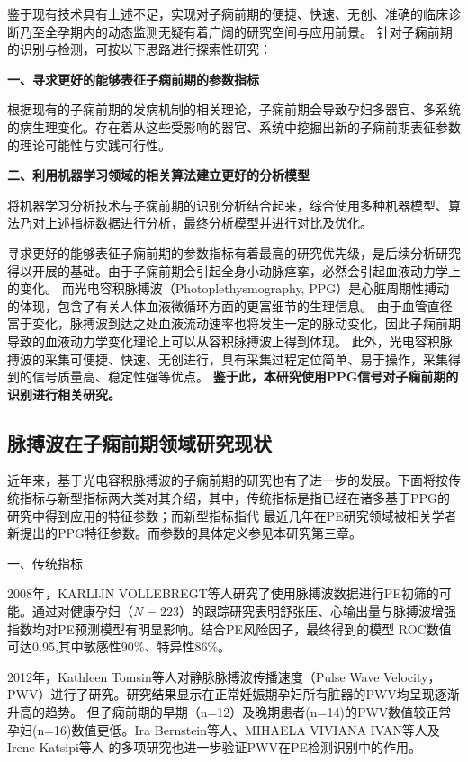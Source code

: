 鉴于现有技术具有上述不足，实现对子痫前期的便捷、快速、无创、准确的临床诊断乃至全孕期内的动态监测无疑有着广阔的研究空间与应用前景。
针对子痫前期的识别与检测，可按以下思路进行探索性研究：

\textbf{一、寻求更好的能够表征子痫前期的参数指标}

根据现有的子痫前期的发病机制的相关理论，子痫前期会导致孕妇多器官、多系统的病生理变化。存在着从这些受影响的器官、系统中挖掘出新的子痫前期表征参数的理论可能性与实践可行性。

\textbf{二、利用机器学习领域的相关算法建立更好的分析模型}

将机器学习分析技术与子痫前期的识别分析结合起来，综合使用多种机器模型、算法乃对上述指标数据进行分析，最终分析模型并进行对比及优化。

寻求更好的能够表征子痫前期的参数指标有着最高的研究优先级，是后续分析研究得以开展的基础。由于子痫前期会引起全身小动脉痉挛，必然会引起血液动力学上的变化。
而光电容积脉搏波（Photoplethysmography, PPG）是心脏周期性搏动的体现，包含了有关人体血液微循环方面的更富细节的生理信息\cite{PPGYY}。
由于血管直径富于变化，脉搏波到达之处血液流动速率也将发生一定的脉动变化，因此子痫前期导致的血液动力学变化理论上可以从容积脉搏波上得到体现。
此外，光电容积脉搏波的采集可便捷、快速、无创进行，具有采集过程定位简单、易于操作，采集得到的信号质量高、稳定性强等优点。
\textbf{鉴于此，本研究使用PPG信号对子痫前期的识别进行相关研究。}

\subsection{脉搏波在子痫前期领域研究现状}
近年来，基于光电容积脉搏波的子痫前期的研究也有了进一步的发展。下面将按传统指标与新型指标两大类对其介绍，其中，传统指标是指已经在诸多基于PPG的研究中得到应用的特征参数；而新型指标指代
最近几年在PE研究领域被相关学者新提出的PPG特征参数。而参数的具体定义参见本研究第三章。

一、传统指标

2008年，KARLIJN VOLLEBREGT等人\cite{KARLIJN2008}研究了使用脉搏波数据进行PE初筛的可能。通过对健康孕妇（$N=223$）的跟踪研究表明舒张压、心输出量与脉搏波增强指数均对PE预测模型有明显影响。结合PE风险因子，最终得到的模型
ROC数值可达0.95,其中敏感性90\%、特异性86\%。

2012年，Kathleen Tomsin等人\cite{Tomsin2012}对静脉脉搏波传播速度（Pulse Wave Velocity，PWV）进行了研究。研究结果显示在正常妊娠期孕妇所有脏器的PWV均呈现逐渐升高的趋势。
但子痫前期的早期（n=12）及晚期患者(n=14)的PWV数值较正常孕妇(n=16)数值更低。Ira Bernstein等人\cite{Ira2014}、MIHAELA VIVIANA IVAN等人\cite{VivianaIvan2018}及Irene Katsipi等人\cite{Katsipi2014}
的多项研究也进一步验证PWV在PE检测识别中的作用。

